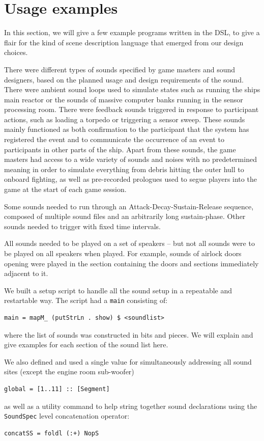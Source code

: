 \section{Usage examples}

In this section, we will give a few example programs written in the
DSL, to give a flair for the kind of scene description language that
emerged from our design choices.

There were different types of sounds specified by game masters and sound designers, based on the planned usage and design requirements of the sound. There were ambient sound loops used to simulate states such as running the ships main reactor or the sounds of massive computer banks running in the sensor processing room. There were feedback sounds triggered in response to participant actions, such as loading a torpedo or triggering a sensor sweep. These sounds mainly functioned as both confirmation to the participant that the system has registered the event and to communicate the occurrence of an event to participants in other parts of the ship. Apart from these sounds, the game masters had access to a wide variety of sounds and noises with no predetermined meaning in order to simulate everything from debris hitting the outer hull to onboard fighting, as well as pre-recorded prologues used to segue players into the game at the start of each game session.

Some sounds needed to run through an Attack-Decay-Sustain-Release sequence, composed of multiple sound files and an arbitrarily long sustain-phase. Other sounds needed to trigger with fixed time intervals.

All sounds needed to be played on a set of speakers -- but not all sounds were to be played on all speakers when played. For example, sounds of airlock doors opening were played in the section containing the doors and sections immediately adjacent to it.

We built a setup script to handle all the sound setup in a repeatable and restartable way. The script had a \texttt{main} consisting of:
\begin{verbatim}
main = mapM_ (putStrLn . show) $ <soundlist>
\end{verbatim}
where the list of sounds was constructed in bits and pieces. We will explain and give examples for each section
of the sound list here.

We also defined and used a
single value for simultaneously addressing all sound sites (except the engine room
sub-woofer)
\begin{verbatim}
global = [1..11] :: [Segment] 
\end{verbatim}
as well as a utility command to help string together sound
declarations using the \texttt{SoundSpec} level concatenation
operator:
\begin{verbatim}
concatSS = foldl (:+) NopS
\end{verbatim}

